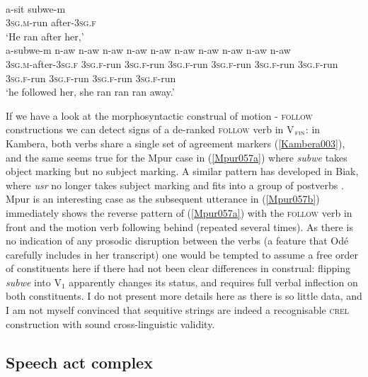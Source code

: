 \ea 
{}\\
\ea \label{Mpur057a}
\gll a-sit subwe-m \\
\textsc{3}\textsc{sg}.\textsc{m}-run after-\textsc{3}\textsc{sg}.\textsc{f} \\
\glft `He ran after her,' \\ 
\ex \label{Mpur057b}
\gll a-subwe-m n-aw n-aw n-aw n-aw n-aw n-aw n-aw n-aw n-aw n-aw \\
\textsc{3}\textsc{sg}.\textsc{m}-after-\textsc{3}\textsc{sg}.\textsc{f} \textsc{3}\textsc{sg}.\textsc{f}-run \textsc{3}\textsc{sg}.\textsc{f}-run \textsc{3}\textsc{sg}.\textsc{f}-run \textsc{3}\textsc{sg}.\textsc{f}-run \textsc{3}\textsc{sg}.\textsc{f}-run \textsc{3}\textsc{sg}.\textsc{f}-run \textsc{3}\textsc{sg}.\textsc{f}-run \textsc{3}\textsc{sg}.\textsc{f}-run \textsc{3}\textsc{sg}.\textsc{f}-run \textsc{3}\textsc{sg}.\textsc{f}-run\\
\glft `he followed her, she ran ran ran away.'\\ 
\z
\z

If we have a look at the morphosyntactic construal of motion - \textsc{follow} constructions we can detect signs of a de-ranked \textsc{follow} verb in V$_{\textsc{fin}}$: in Kambera, both verbs share a single set of agreement markers (\ref{Kambera003}), and the same seems true for the Mpur case in (\ref{Mpur057a}) where \textit{subwe} takes object marking but no subject marking. A similar pattern has developed in Biak, where \textit{usr} no longer takes subject marking and fits into a group of postverbs \citep[183, and pp. 187--91]{vanheuvel2006}. Mpur is an interesting case as the subsequent utterance in (\ref{Mpur057b}) immediately shows the reverse pattern of (\ref{Mpur057a}) with the \textsc{follow} verb in front and the motion verb following behind (repeated several times). As there is no indication of any prosodic disruption between the verbs (a feature that Odé carefully includes in her transcript) one would be tempted to assume a free order of constituents here if there had not been clear differences in construal: flipping \textit{subwe} into V$_{1}$ apparently changes its status, and requires full verbal inflection on both constituents. I do not present more details here as there is so little data, and I am not myself convinced that sequitive strings are indeed a recognisable \textsc{crel} construction with sound cross-linguistic validity.

\subsection{Speech act complex} \label{sec:speechactcomplex}

